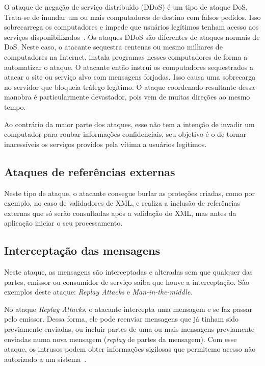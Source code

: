 O ataque de negação de serviço distribuído (DDoS) é um tipo de ataque DoS. Trata-se de inundar um ou mais computadores de destino com falsos pedidos. Isso sobrecarrega os computadores e impede que usuários legítimos tenham acesso aos serviços disponibilizados~\cite{kim2010fundamentals}.
Os ataques DDoS são diferentes de ataques normais de DoS. Neste caso, o atacante sequestra centenas ou mesmo milhares de computadores na Internet, instala programas nesses computadores de forma a automatizar o ataque. O atacante então instrui os computadores sequestrados a atacar o site ou serviço alvo com mensagens forjadas. Isso causa uma sobrecarga no servidor que bloqueia tráfego legítimo. O ataque coordenado resultante dessa manobra é particularmente devastador,  pois vem de muitas direções ao mesmo tempo.

Ao contrário da maior parte dos ataques, esse não tem a intenção de invadir um computador para roubar informações confidenciais, seu objetivo é o de tornar inacessíveis os serviços providos pela vítima a usuários legítimos.

\subsection{Ataques de referências externas}

Neste tipo de ataque, o atacante consegue burlar as proteções criadas, como por exemplo, no caso de validadores de XML, e realiza a inclusão de referências externas que só serão consultadas após a validação do XML, mas antes da aplicação iniciar o seu processamento.

\subsection{Interceptação das mensagens}

Neste ataque, as mensagens são interceptadas e alteradas sem que qualquer das partes, emissor ou consumidor de serviço saiba que houve a interceptação. São exemplos deste ataque: \emph{Replay Attacks} e \emph{Man-in-the-middle}.

No ataque \emph{Replay Attacks}, o atacante intercepta uma mensagem  e se faz passar pelo emissor. Dessa forma, ele pode reenviar mensagens que já tinham sido previamente enviadas, ou incluir partes de uma ou mais mensagens previamente enviadas numa nova mensagem (\emph{replay} de partes da mensagem). Com esse ataque, os intrusos podem obter informações sigilosas que permitemo acesso não autorizado a um sistema~\cite{kim2010fundamentals}.

